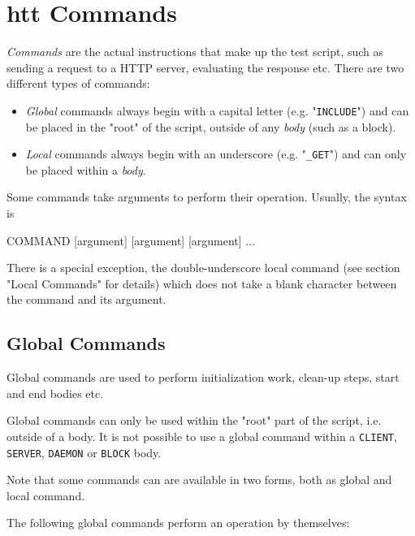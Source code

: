 \chapter{htt Commands}
\label{chap:commands}

\textit{Commands} are the actual instructions that make up the test script, such as 
sending a request to a HTTP server, evaluating the response etc. There are two 
different types of commands:

\begin{itemize}
\item \textit{Global} commands always begin with a capital letter (e.g. "\texttt{INCLUDE}") and 
      can be placed in the "root" of the script, outside of any \textit{body} (such as a block).
\item \textit{Local} commands always begin with an underscore (e.g. "\texttt{\_GET}") and 
      can only be placed within a \textit{body}.
\end{itemize}

Some commands take arguments to perform their operation. Usually, the syntax is

\begin{usplisting}
    COMMAND [argument] [argument] [argument] ...
\end{usplisting}

There is a special exception, the double-underscore local command (see section 
"Local Commands" for details) which does not take a blank character between the 
command and its argument.


\newpage
\section{Global Commands}
\label{chap:globalCommands}

Global commands are used to perform initialization work, clean-up steps, 
start and end bodies etc.

Global commands can only be used within the "root" part of the script, 
i.e. outside of a body. It is not possible to use a global command within 
a \texttt{CLIENT}, \texttt{SERVER}, \texttt{DAEMON} or \texttt{BLOCK} body. 

Note that some commands can are available in two forms, both as global 
and local command.

The following global commands perform an operation by themselves:

